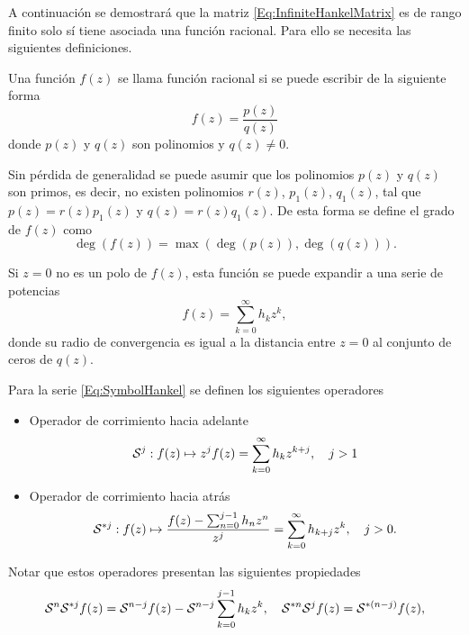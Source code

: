         A continuación se demostrará que la matriz \eqref{Eq:InfiniteHankelMatrix} es de rango finito solo sí tiene asociada una función racional. Para ello se necesita las siguientes definiciones. 
        
        \begin{definition}
            Una función $f(z)$ se llama función racional si se puede escribir de la siguiente forma
        \begin{equation}
	        f(z) = \frac{p(z)}{q(z)}
	        \label{Eq:RationalFunction}
        \end{equation}
        donde $p(z)$ y $q(z)$ son polinomios y $q(z)\neq 0$.
        \end{definition}
         Sin pérdida de generalidad se puede asumir que los polinomios $p(z)$ y $q(z)$ son primos, es decir, no existen polinomios $r(z)$, $p_1(z)$, $q_1(z)$, tal que $p(z)=r(z)p_1(z)$ y $q(z)=r(z)q_1(z)$. De esta forma se define el grado de $f(z)$ como
        \begin{equation}
            \deg(f(z)) = \max(\deg(p(z)),\deg(q(z))).
            \label{Eq:degreeRationalfunction}
        \end{equation}

        Si $z=0$ no es un polo de $f(z)$, esta función se puede expandir a una serie de potencias 
		\begin{equation}
		    f(z) = \sum_{k=0}^\infty h_k z^{k},
			\label{Eq:SymbolHankel}
		\end{equation}
		donde su radio de convergencia es igual a la distancia entre $z=0$ al conjunto de ceros de $q(z)$. 

        \begin{definition}
            Para la serie \eqref{Eq:SymbolHankel} se definen los siguientes operadores
            \begin{itemize}
                \item Operador de corrimiento hacia adelante
		              \begin{equation} \mathcal{S}^j:f(z)\mapsto z^j f(z) = \sum_{k=0}^\infty h_kz^{k+j},\quad j>1\label{eq:shiftOperator}\end{equation}
                \item Operador de corrimiento hacia atrás
                \begin{equation}\mathcal{S}^{*j}:f(z)\mapsto \frac{f(z)-\sum_{n=0}^{j-1}h_nz^n}{z^j} = \sum_{k=0}^\infty h_{k+j}z^k, \quad j>0.\label{eq:shiftOperatorAdjoint}\end{equation}
            \end{itemize}
        \end{definition}
		Notar que estos operadores presentan las siguientes propiedades
		\begin{equation}\mathcal{S}^n\mathcal{S}^{*j}f(z) = \mathcal{S}^{n-j}f(z)-\mathcal{S}^{n-j}\sum_{k=0}^{j-1}h_kz^k, \quad \mathcal{S}^{*n}\mathcal{S}^jf(z) = \mathcal{S}^{*(n-j)}f(z),\label{eq:ShiftOperatorProp}\end{equation}
		
